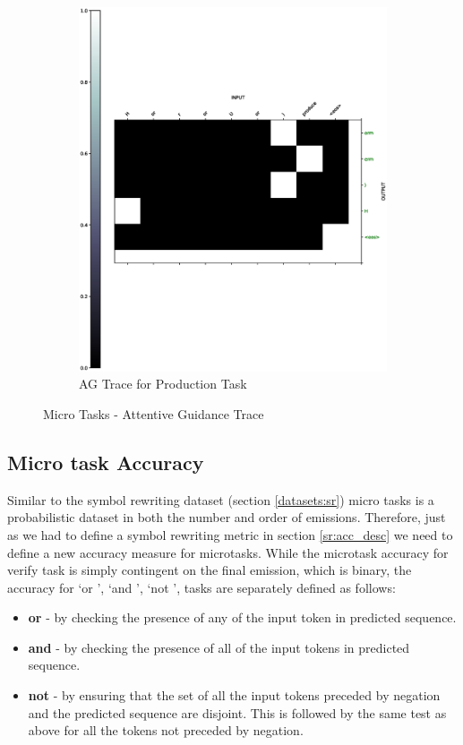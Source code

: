 \begin{figure}[ht]
\begin{subfigure}[b]{0.5\linewidth}
		\includegraphics[width=0.95\linewidth]{./figs/micro/prod-eps}
		\fi 
		\caption{AG Trace for Production Task} 
		\label{ag_prd} 
		\vspace{2ex}
	\end{subfigure}
	\caption{Micro Tasks - Attentive Guidance Trace}
	\label{mt_trace}
\end{figure}

\subsection{Micro task Accuracy}
Similar to the symbol rewriting dataset (section \ref{datasets:sr}) micro tasks is a probabilistic dataset in both the number and order of emissions. Therefore, just as we had to define a symbol rewriting metric in section \ref{sr:acc_desc} we need to define a new accuracy measure for microtasks. While the microtask accuracy for verify task is simply contingent on the final emission, which is binary, the accuracy for \lq or \rq{}, \lq and \rq{}, \lq not \rq{}, tasks are separately defined as follows:

\begin{itemize}
	\item \textbf{or} - by checking the presence of any of the input token in predicted sequence.
	\item \textbf{and} - by checking the presence of all of the input tokens in predicted sequence.
	\item \textbf{not} - by ensuring that the set of all the input tokens preceded by negation and the predicted sequence are disjoint. This is followed by the same test as above for all the tokens not preceded by negation. 
\end{itemize}

